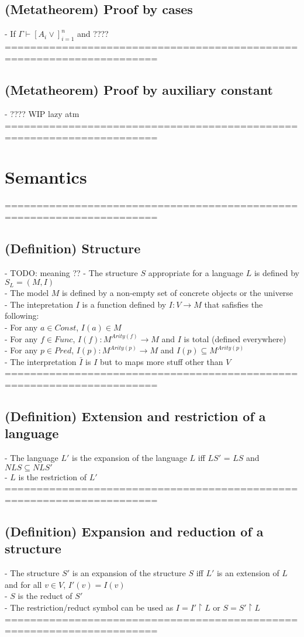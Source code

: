 \documentclass{article}
\begin{document}
\subsection{(Metatheorem) Proof by cases}
	- If $\Gamma \vdash [A_i \lor]_{i=1}^{n}$ and ????
	======================================================================
\subsection{(Metatheorem) Proof by auxiliary constant}
	- ???? WIP lazy atm
	======================================================================

\section{Semantics}
	======================================================================
\subsection{(Definition) Structure}
	- TODO: meaning ??
	- The structure $S$ appropriate for a language $L$ is defined by $S_L = (M, I)$ \\
	- The model $M$ is defined by a non-empty set of concrete objects or the universe \\
	- The intepretation $I$ is a function defined by $I: V \rightarrow M$ that safisfies the following: \\
		- For any $a \in Const$, $I(a) \in M$ \\
		- For any $f \in Func$, $I(f): M^{Arity(f)} \rightarrow M$ and $I$ is total (defined everywhere) \\
		- For any $p \in Pred$, $I(p): M^{Arity(p)} \rightarrow M$ and $I(p) \subseteq M^{Arity(p)}$ \\
	- The interpretation $\bar I$ is $I$ but to maps more stuff other than $V$
	======================================================================
\subsection{(Definition) Extension and restriction of a language}
	- The language $L'$ is the expansion of the language $L$ iff $LS'$ = $LS$ and $NLS \subseteq NLS'$ \\
	- $L$ is the restriction of $L'$ \\
	======================================================================
\subsection{(Definition) Expansion and reduction of a structure}
	- The structure $S'$ is an expansion of the structure $S$ iff $L'$ is an extension of $L$ and for all $v \in V$, $I'(v) = I(v)$ \\
	- $S$ is the reduct of $S'$ \\
	- The restriction/reduct symbol can be used as $I = I' \upharpoonright L$ or $S = S' \upharpoonright L$ \\
	======================================================================
\end{document}
